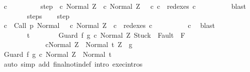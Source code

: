 \begin{isabellebody}
\ c{\isacharprime}{\isacharprime}\ \isanewline
\ \ \ \ \ \ \ \ step{\isacharcolon}\ {\isachardoublequoteopen}{\isasymGamma}{\isasymturnstile}\ {\isacharparenleft}c{\isacharprime}{\isacharcomma}\ Normal\ Z{\isacharparenright}\ {\isasymrightarrow}\ {\isacharparenleft}c{\isacharprime}{\isacharprime}{\isacharcomma}\ Normal\ Z{\isacharparenright}{\isachardoublequoteclose}\ \ \ c{\isacharprime}{\isacharprime}{\isacharcolon}\ {\isachardoublequoteopen}c\ {\isasymin}\ redexes\ c{\isacharprime}{\isacharprime}{\isachardoublequoteclose}\isanewline
\ \ \ \ \ \ \ \ \isamarkupfalse%
\ blast\isanewline
\ \ \ \ \ \ \isamarkupfalse%
\ steps\ \isamarkupfalse%
\ \isamarkupfalse%
\ step\ \isanewline
\ \ \ \ \ \ \isamarkupfalse%
\ \isamarkupfalse%
\ {\isachardoublequoteopen}{\isasymexists}c{\isacharprime}{\isachardot}\ {\isasymGamma}{\isasymturnstile}\ {\isacharparenleft}Call\ p{\isacharcomma}\ Normal\ {\isasymsigma}{\isacharparenright}\ {\isasymrightarrow}\isactrlsup {\isacharplus}\ {\isacharparenleft}c{\isacharprime}{\isacharcomma}\ Normal\ Z{\isacharparenright}\ {\isasymand}\ c\ {\isasymin}\ redexes\ c{\isacharprime}{\isachardoublequoteclose}\isanewline
\ \ \ \ \ \ \ \ \isamarkupfalse%
\ c{\isacharprime}{\isacharprime}\ \isamarkupfalse%
\ blast\isanewline
\ \ \ \ \isamarkupfalse%
\isanewline
\ \ \ \ \ \ \isamarkupfalse%
\ t\isanewline
\ \ \ \ \ \ \isamarkupfalse%
\ {\isachardoublequoteopen}{\isasymGamma}{\isasymturnstile}{\isasymlangle}Guard\ f\ g\ c\ {\isacharcomma}Normal\ Z{\isasymrangle}\ {\isasymRightarrow}{\isasymnotin}{\isacharparenleft}{\isacharbraceleft}Stuck{\isacharbraceright}\ {\isasymunion}\ Fault\ {\isacharbackquote}\ {\isacharparenleft}{\isacharminus}F{\isacharparenright}{\isacharparenright}{\isachardoublequoteclose}\ \isanewline
\ \ \ \ \ \ \ \ \ \ \ \ \ {\isachardoublequoteopen}{\isasymGamma}{\isasymturnstile}{\isasymlangle}c{\isacharcomma}Normal\ Z{\isasymrangle}\ {\isasymRightarrow}\ Normal\ t{\isachardoublequoteclose}\ {\isachardoublequoteopen}Z\ {\isasymin}\ g{\isachardoublequoteclose}\isanewline
\ \ \ \ \ \ \isamarkupfalse%
\ {\isachardoublequoteopen}{\isasymGamma}{\isasymturnstile}{\isasymlangle}Guard\ f\ g\ c\ {\isacharcomma}Normal\ Z{\isasymrangle}\ {\isasymRightarrow}\ Normal\ t{\isachardoublequoteclose}\isanewline
\ \ \ \ \ \ \ \ \isamarkupfalse%
\ {\isacharparenleft}auto\ simp\ add{\isacharcolon}\ final{\isacharunderscore}notin{\isacharunderscore}def\ intro{\isacharcolon}\ exec{\isachardot}intros\ {\isacharparenright}\isanewline

\end{isabellebody}
